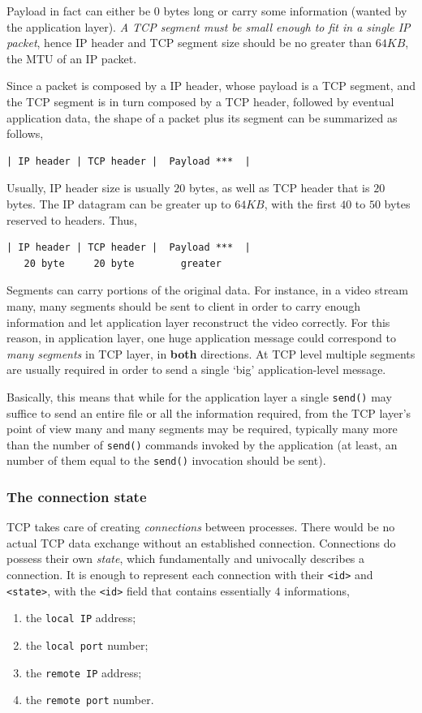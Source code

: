\documentclass[10pt]{\classname}
\begin{document}
Payload in fact can either be $0$ bytes long or carry some information (wanted
by the application layer). \emph{A TCP segment must be small enough to fit in a
single IP packet}, hence IP header and TCP segment size should be no greater
than $64KB$, the MTU of an IP packet.

Since a packet is composed by a IP header, whose payload is a TCP segment, and the
TCP segment is in turn composed by a TCP header, followed by eventual
application data, the shape of a packet plus its segment can be summarized as
follows,

\begin{verbatim}
| IP header | TCP header |  Payload ***  |
\end{verbatim}

Usually, IP header size is usually $20$ bytes, as well as TCP
header that is $20$ bytes. The IP datagram can be greater up to $64KB$, with
the first $40$ to $50$ bytes reserved to headers. Thus,

\begin{verbatim}
| IP header | TCP header |  Payload ***  |
   20 byte     20 byte        greater
\end{verbatim}

Segments can carry portions of the original data. For instance, in a video
stream many, many segments should be sent to client in order to carry enough
information and let application layer reconstruct the video correctly. For
this reason, in application layer, one huge application message could correspond to
\emph{many segments} in TCP layer, in \textbf{both} directions. At TCP
level multiple segments are usually required in order to send a single
`big' application-level message.

Basically, this means that while for the application layer a single
\texttt{send()} may suffice to send an entire file or all the information
required, from the TCP layer's point of view many and many segments may be
required, typically many more than the number of \texttt{send()} commands
invoked by the application (at least, an number of them equal to the
\texttt{send()} invocation should be sent).

\subsubsection{The connection state}

TCP takes care of creating \emph{connections} between processes. There would be
no actual TCP data exchange without an established connection. Connections do
possess their own \emph{state}, which fundamentally and univocally describes a
connection. It is enough to represent each connection with their \texttt{<id>}
and \texttt{<state>}, with the \texttt{<id>} field that contains essentially
$4$ informations,
\begin{enumerate}
    \item the \texttt{local IP} address;
    \item the \texttt{local port} number;
    \item the \texttt{remote IP} address;
    \item the \texttt{remote port} number.
\end{enumerate}
\end{document}
